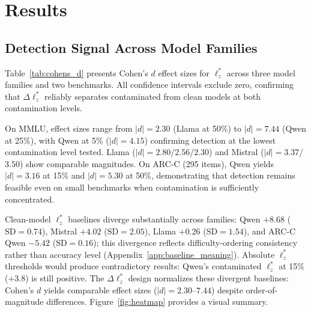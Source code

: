 \section{Results}
\label{sec:results}

\subsection{Detection Signal Across Model Families}
\label{sec:detection}

Table~\ref{tab:cohens_d} presents Cohen's $d$ effect sizes for $\ell_z^*$ across three model families and two benchmarks.
All confidence intervals exclude zero, confirming that $\Delta\ell_z^*$ reliably separates contaminated from clean models at both contamination levels.

On MMLU, effect sizes range from $|d|{=}2.30$ (Llama at 50\%) to $|d|{=}7.44$ (Qwen at 25\%), with Qwen at 5\% ($|d|{=}4.15$) confirming detection at the lowest contamination level tested. Llama ($|d|{=}2.80$/$2.56$/$2.30$) and Mistral ($|d|{=}3.37$/$3.50$) show comparable magnitudes.
On ARC-C (295 items), Qwen yields $|d|{=}3.16$ at 15\% and $|d|{=}5.30$ at 50\%, demonstrating that detection remains feasible even on small benchmarks when contamination is sufficiently concentrated.

Clean-model $\ell_z^*$ baselines diverge substantially across families: Qwen ${+}8.68$ ($\text{SD}{=}0.74$), Mistral ${+}4.02$ ($\text{SD}{=}2.05$), Llama ${+}0.26$ ($\text{SD}{=}1.54$), and ARC-C Qwen ${-}5.42$ ($\text{SD}{=}0.16$); this divergence reflects difficulty-ordering consistency rather than accuracy level (Appendix~\ref{app:baseline_meaning}).
Absolute $\ell_z^*$ thresholds would produce contradictory results: Qwen's contaminated $\ell_z^*$ at 15\% (${+}3.8$) is still positive.
The $\Delta\ell_z^*$ design normalizes these divergent baselines: Cohen's $d$ yields comparable effect sizes ($|d|{=}2.30$--$7.44$) despite order-of-magnitude differences.
Figure~\ref{fig:heatmap} provides a visual summary.


